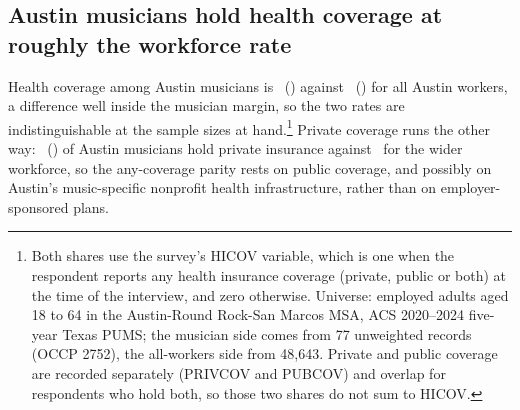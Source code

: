 \subsection{Austin musicians hold health coverage at roughly the workforce rate}

Health coverage among Austin musicians is \NPumsAustinMusHicov\
(\NPumsAustinMusHicovMoe) against \NPumsAustinAllworkHicov\
(\NPumsAustinAllworkHicovMoe) for all Austin workers, a difference well
inside the musician margin, so the two rates are indistinguishable at the
sample sizes at hand.\footnote{Both shares use the survey's HICOV variable,
which is one when the respondent reports any health insurance coverage
(private, public or both) at the time of the interview, and zero otherwise.
Universe: employed adults aged 18 to 64 in the Austin-Round Rock-San Marcos
MSA, ACS 2020--2024 five-year Texas PUMS; the musician side comes from 77
unweighted records (OCCP 2752), the all-workers side from 48,643. Private and
public coverage are recorded separately (PRIVCOV and PUBCOV) and overlap for
respondents who hold both, so those two shares do not sum to HICOV.}
Private coverage runs the other way: \NPumsAustinMusPrivcov\
(\NPumsAustinMusPrivcovMoe) of Austin musicians hold private insurance
against \NPumsAustinAllworkPrivcov\ for the wider workforce, so the
any-coverage parity rests on public coverage, and possibly on Austin's
music-specific nonprofit health infrastructure, rather than on
employer-sponsored plans.

